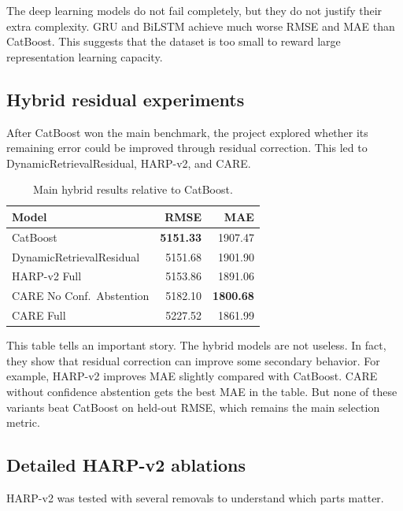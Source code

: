 \documentclass[conference]{IEEEtran}
\begin{document}
The deep learning models do not fail completely, but they do not justify their extra complexity. GRU and BiLSTM achieve much worse RMSE and MAE than CatBoost. This suggests that the dataset is too small to reward large representation learning capacity.

\subsection{Hybrid residual experiments}
After CatBoost won the main benchmark, the project explored whether its remaining error could be improved through residual correction. This led to DynamicRetrievalResidual, HARP-v2, and CARE.

\begin{table}[t]
\caption{Main hybrid results relative to CatBoost.}
\label{tab:hybrid_main}
\centering
\begin{tabular}{p{3.2cm}rr}
\toprule
\textbf{Model} & \textbf{RMSE} & \textbf{MAE} \\
\midrule
CatBoost & \textbf{5151.33} & 1907.47 \\
DynamicRetrievalResidual & 5151.68 & 1901.90 \\
HARP-v2 Full & 5153.86 & 1891.06 \\
CARE No Conf.\ Abstention & 5182.10 & \textbf{1800.68} \\
CARE Full & 5227.52 & 1861.99 \\
\bottomrule
\end{tabular}
\end{table}

This table tells an important story. The hybrid models are not useless. In fact, they show that residual correction can improve some secondary behavior. For example, HARP-v2 improves MAE slightly compared with CatBoost. CARE without confidence abstention gets the best MAE in the table. But none of these variants beat CatBoost on held-out RMSE, which remains the main selection metric.

\subsection{Detailed HARP-v2 ablations}
HARP-v2 was tested with several removals to understand which parts matter.
\end{document}
